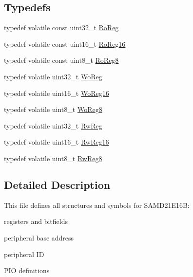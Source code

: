 \subsection*{Typedefs}
\begin{DoxyCompactItemize}
\item 
typedef volatile const uint32\+\_\+t \mbox{\hyperlink{group___s_a_m_d21_e16_b__definitions_ga5d556f8391af4141be23f7334ac9dd68}{Ro\+Reg}}
\item 
typedef volatile const uint16\+\_\+t \mbox{\hyperlink{group___s_a_m_d21_e16_b__definitions_gaebf6e33c2d49a802e06e22a95ea9d0d0}{Ro\+Reg16}}
\item 
typedef volatile const uint8\+\_\+t \mbox{\hyperlink{group___s_a_m_d21_e16_b__definitions_ga0d957f1433aaf5d70e4dc2b68288442d}{Ro\+Reg8}}
\item 
typedef volatile uint32\+\_\+t \mbox{\hyperlink{group___s_a_m_d21_e16_b__definitions_gac0f96d4e8018367b38f527007cf0eafd}{Wo\+Reg}}
\item 
typedef volatile uint16\+\_\+t \mbox{\hyperlink{group___s_a_m_d21_e16_b__definitions_ga0ab0e5f6c8301aa1c2068e511d854094}{Wo\+Reg16}}
\item 
typedef volatile uint8\+\_\+t \mbox{\hyperlink{group___s_a_m_d21_e16_b__definitions_ga5e336e5a36ee12ebeafb021108e5275b}{Wo\+Reg8}}
\item 
typedef volatile uint32\+\_\+t \mbox{\hyperlink{group___s_a_m_d21_e16_b__definitions_gacf1496e3bbe303e55f627fc7558a68c7}{Rw\+Reg}}
\item 
typedef volatile uint16\+\_\+t \mbox{\hyperlink{group___s_a_m_d21_e16_b__definitions_gacce07556c80fc352ae607f225f19fed5}{Rw\+Reg16}}
\item 
typedef volatile uint8\+\_\+t \mbox{\hyperlink{group___s_a_m_d21_e16_b__definitions_gae361754be775bb192f85821d3ab33c17}{Rw\+Reg8}}
\end{DoxyCompactItemize}


\subsection{Detailed Description}
This file defines all structures and symbols for S\+A\+M\+D21\+E16B\+:
\begin{DoxyItemize}
\item registers and bitfields
\item peripheral base address
\item peripheral ID
\item P\+IO definitions 
\end{DoxyItemize}

